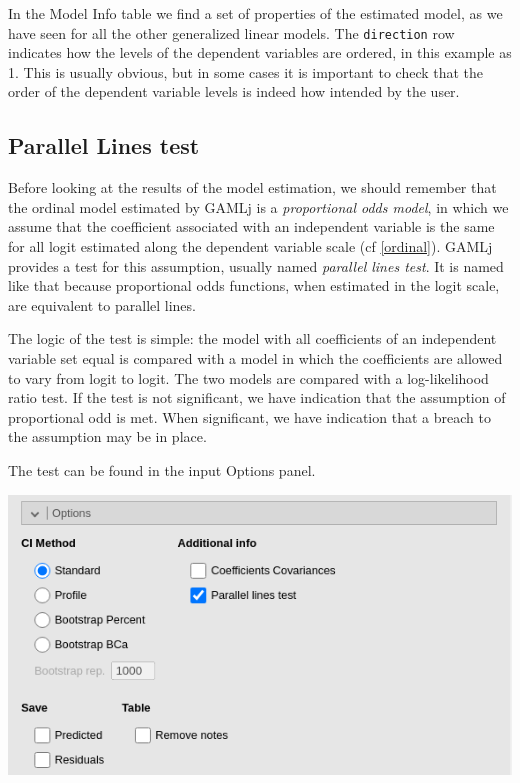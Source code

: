 \documentclass[
]{book}
\begin{document}
In the {Model Info} table we find a set of properties of the estimated model, as we have seen for all the other generalized linear models. The \texttt{direction} row indicates how the levels of the dependent variables are ordered, in this example as 1. This is usually obvious, but in some cases it is important to check that the order of the dependent variable levels is indeed how intended by the user.

\hypertarget{parallellines}{%
\subsection{Parallel Lines test}\label{parallellines}}

Before looking at the results of the model estimation, we should remember that the ordinal model estimated by {GAMLj} is a \emph{proportional odds model}, in which we assume that the coefficient associated with an independent variable is the same for all logit estimated along the dependent variable scale (cf \ref{ordinal}). {GAMLj} provides a test for this assumption, usually named \emph{parallel lines test}. It is named like that because proportional odds functions, when estimated in the logit scale, are equivalent to parallel lines.

The logic of the test is simple: the model with all coefficients of an independent variable set equal is compared with a model in which the coefficients are allowed to vary from logit to logit. The two models are compared with a log-likelihood ratio test. If the test is not significant, we have indication that the assumption of proportional odd is met. When significant, we have indication that a breach to the assumption may be in place.

The test can be found in the input {Options} panel.

\includegraphics{bookletpics/3_ordinal_input2.png}
\end{document}
